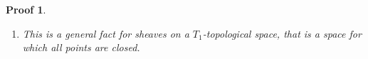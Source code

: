 \documentclass[a4paper, english, 11pt]{article}
\newcommand{\kk}[0]{\textbf{k}}
\newcommand{\0}{\vec{0}}
\newcommand{\Hom}[0]{\text{Hom}}
\newtheorem*{pf}{Proof} }
\begin{document}
\begin{pf}
\begin{enumerate}
     
     Now if $\varprojlim\limits_{]-x;y[\ni \alpha}M((x,y))$ is finite dimensional then the above product in the right hand side of~\eqref{eq:porjlimM} is a finite product and thus a direct sum: 
     $\prod_{\substack{I\in \mathbb{B}(M\circ G)\\ 0 \in \text{closure}(I)}} \kk \; \simeq \; \bigoplus_{\substack{I\in \mathbb{B}(M\circ G)\\ 0 \in \text{closure}(I)}}.$ Therefore we have 
     \begin{align*}
        \varprojlim_{]-x;y[\ni \alpha}M((x,y))%
        & \simeq \bigoplus_{\substack{I\in \mathbb{B}(M\circ G)\\ 0 \in \text{closure}(I)}} \kk  \\
        &\simeq \varprojlim_{]-x;y[\ni \alpha} \Hom \left ( M((x,y)), \kk \right ) \; \text{ (by~\eqref{eq:DefMoG} and finite dimensionality)}\\ 
        &\simeq \tilde{M}_\alpha \; \text{ (by~\eqref{eq:defMtilde})}\\
        &\simeq \bar{M}_\alpha.
    \end{align*}
    \item This is a general fact for sheaves on a $T_1$-topological space, that is a space for which all   points are closed.
\end{enumerate}
\end{pf}
\end{document}
